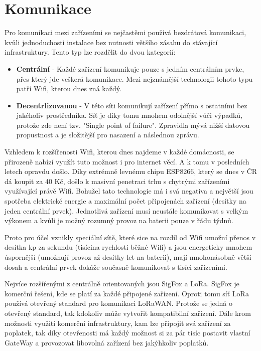 \documentclass[thesis=B,czech]{FITthesis}[2019/12/23]
\begin{document}
\section{Komunikace}    %
    Pro komunikaci mezi zařízeními se nejčastěmi používá bezdrátová komunikaci, kvůli jednoduchosti instalace bez nutnosti většího zásahu do stávající infrastruktury. Tento typ lze rozdělit do dvou kategorií:
    \begin{itemize}
        \item \textbf{Centrální} - Každé zařízení komunikuje pouze s jedním centrálním prvke, přes který jde veškerá komunikace. Mezi nejznámější technologii tohoto typu patří Wifi, kterou dnes zná každý.
        \item \textbf{Decentrlizovanou} - V této síti komunikují zařízení přímo s ostatními bez jakéholiv prostředníka. Síť je díky tomu mnohem odolnější vůči výpadků, protože zde není tzv. "Single point of failure". Zpravidla mývá nižší datovou propustnost a je složitější pro nasazení a následnou zprávu.
    \end{itemize}
    Vzhledem k rozšířenosti Wifi, kterou dnes najdeme v každé domácnosti, se přirozeně nabízí využít tuto možnost i pro internet věcí. A k tomu v posledních letech opravdu došlo. Díky extrémně levnému chipu ESP8266, který se dnes v ČR dá koupit za 40 Kč, došlo k masivní penetraci trhu s chytrými zařízeními využívající právě Wifi. Bohužel tato technologie má i svá negativa a největší jsou spotřeba elektrické energie a maximální počet připojenách zařízení (desítky na jeden centrální prvek). Jednotlivá zařízení musí neustále komunikovat s velkým výkonem a kvůli je možný rozumný provoz na baterii pouze v řádu týdnů.

    Proto pro účel vznikly speciální sítě, které sice na rozdíl od Wifi umožní přenos v desítka kp za sekundu (tisícina rychlosti běžné Wifi) a jsou energeticky mnohem úspornější (umožnují provoz až desítky let na baterii), mají mnohonásobně větší dosah a centrální prvek dokáže současně komunikovat s tisíci zařízeními. 
    
    Nejvíce rozšířenými z centrálně orientovaných jsou SigFox a LoRa. SigFox je komerční řešení, kde se platí za každé připojené zařízení. Oproti tomu síť LoRa používá otevřený standard pro komunikaci LoRaWAN. Protože se jedná o otevřený standard, tak kdokoliv může vytvořit kompatibilní zařízení. Dále krom možnosti využití komerční infrastruktury, kam lze připojit svá zařízení za poplatek, tak díky otevřenosti má každý možnost si za pár tisíc postavit vlastní GateWay a provozovat libovolná zařízení bez jakýhkoliv poplatků.
\end{document}
